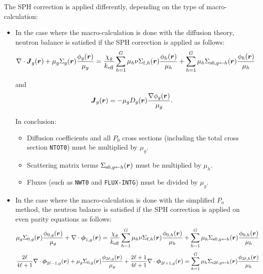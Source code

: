 The SPH correction is applied differently, depending on the type of macro-calculation:
\begin{itemize}

\item In the case where the macro-calculation is done with the diffusion theory, neutron balance is satisfied if the SPH correction is applied as
follows:
\begin{equation}
\nabla\cdot\bff(J)_g(\bff(r))+\mu_g\Sigma_g(\bff(r)) {\phi_g(\bff(r))\over \mu_g}={\chi_g\over k_{\rm eff}}\sum_{h=1}^G \mu_h \nu\Sigma_{{\rm f},h}(\bff(r)) {\phi_h(\bff(r))\over \mu_h}
+\sum_{h=1}^G \mu_h \Sigma_{{\rm s0},g\leftarrow h}(\bff(r)){\phi_h(\bff(r))\over \mu_h}
\label{eq:sph1}
\end{equation}


\noindent and
\begin{equation}
\bff(J)_g(\bff(r))=-\mu_g D_g(\bff(r)){\nabla\phi_g(\bff(r))\over \mu_g} .
\label{eq:sph2}
\end{equation}

In conclusion:
\begin{itemize}
\item Diffusion coefficients and all $P_0$ cross sections (including the total cross section {\tt NTOT0}) must be multiplied by $\mu_g$.
\item Scattering matrix terms $\Sigma_{{\rm s0},g\leftarrow h}(\bff(r))$ must be multiplied by $\mu_h$.
\item Fluxes (such as {\tt NWT0} and {\tt FLUX-INTG}) must be divided by $\mu_g$.
\end{itemize}

\item In the case where the macro-calculation is done with the simplified $P_n$ method, the neutron balance is satisfied if the SPH correction is applied on even parity equations as
follows:\cite{sphedf2}
\begin{equation}
\mu_g\Sigma_{0,g}(\bff(r)) {\phi_{0,g}(\bff(r))\over \mu_g}+\nabla\cdot\bff(\phi)_{1,g}(\bff(r))={\chi_g\over k_{\rm eff}}\sum_{h=1}^G \mu_h \nu\Sigma_{{\rm f},h}(\bff(r)) {\phi_{0,h}(\bff(r))\over \mu_h}
+\sum_{h=1}^G \mu_h \Sigma_{{\rm s0},g\leftarrow h}(\bff(r)){\phi_{0,h}(\bff(r))\over \mu_h}
\label{eq:sph3}
\end{equation}
\begin{equation}
{2\ell\over 4\ell+1}\nabla\cdot\bff(\phi)_{2\ell-1,g}(\bff(r))+\mu_g\Sigma_{0,g}(\bff(r)) {\phi_{2\ell,g}(\bff(r))\over \mu_g}+{2\ell+1\over 4\ell+1}\nabla\cdot\bff(\phi)_{2\ell+1,g}(\bff(r))=\sum_{h=1}^G \mu_h \Sigma_{{\rm s2\ell},g\leftarrow h}(\bff(r)){\phi_{2\ell,h}(\bff(r))\over \mu_h}
\label{eq:sph4}
\end{equation}


\end{itemize}
